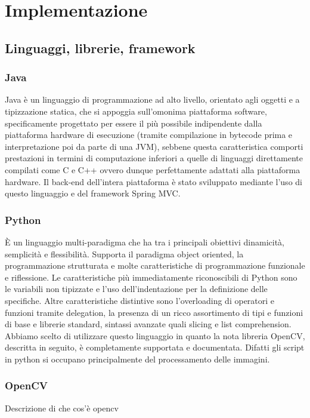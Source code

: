 \documentclass[twoside]{supsistudent}
\begin{document}
\chapter{Implementazione}
\section{Linguaggi, librerie, framework}
\subsection{Java}
Java è un linguaggio di programmazione ad alto livello, orientato agli 
oggetti e a tipizzazione statica, che si appoggia sull'omonima piattaforma software, 
specificamente progettato per essere il più possibile indipendente dalla piattaforma 
hardware di esecuzione (tramite compilazione in bytecode prima e interpretazione poi 
da parte di una JVM), sebbene questa caratteristica comporti prestazioni in termini 
di computazione inferiori a quelle di linguaggi direttamente compilati come C e C++ 
ovvero dunque perfettamente adattati alla piattaforma hardware.
Il back-end dell'intera piattaforma è stato sviluppato mediante l'uso di questo linguaggio e 
del framework Spring MVC.
\subsection{Python}
È un linguaggio multi-paradigma che ha tra i principali obiettivi dinamicità, semplicità
e flessibilità. Supporta il paradigma object oriented, la programmazione strutturata e 
molte caratteristiche di programmazione funzionale e riflessione. Le caratteristiche più 
immediatamente riconoscibili di Python sono le variabili non tipizzate e l'uso 
dell'indentazione per la definizione delle specifiche. Altre caratteristiche distintive 
sono l'overloading di operatori e funzioni tramite delegation, la presenza di un 
ricco assortimento di tipi e funzioni di base e librerie standard, sintassi avanzate 
quali slicing e list comprehension.
Abbiamo scelto di utilizzare questo linguaggio in quanto la nota libreria OpenCV, descritta in 
seguito, è completamente supportata e documentata. Difatti gli script in python si occupano 
principalmente del processamento delle immagini. 
\subsection{OpenCV}
Descrizione di che cos'è opencv
\end{document}

